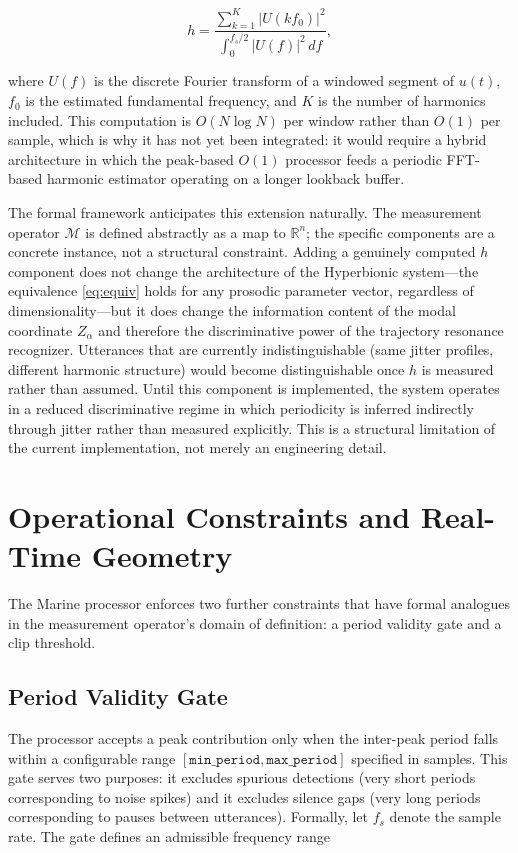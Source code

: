 \documentclass[12pt, a4paper]{article}
\begin{document}
\begin{equation}
h = \frac{\sum_{k=1}^{K} |U(k f_0)|^2}{\int_0^{f_s/2} |U(f)|^2\, df},
\label{eq:h}
\end{equation}

where $U(f)$ is the discrete Fourier transform of a windowed segment of $u(t)$, $f_0$ is the estimated fundamental frequency, and $K$ is the number of harmonics included. This computation is $O(N \log N)$ per window rather than $O(1)$ per sample, which is why it has not yet been integrated: it would require a hybrid architecture in which the peak-based $O(1)$ processor feeds a periodic FFT-based harmonic estimator operating on a longer lookback buffer.

The formal framework anticipates this extension naturally. The measurement operator $\mathcal{M}$ is defined abstractly as a map to $\mathbb{R}^n$; the specific components are a concrete instance, not a structural constraint. Adding a genuinely computed $h$ component does not change the architecture of the Hyperbionic system---the equivalence \eqref{eq:equiv} holds for any prosodic parameter vector, regardless of dimensionality---but it does change the information content of the modal coordinate $Z_\alpha$ and therefore the discriminative power of the trajectory resonance recognizer. Utterances that are currently indistinguishable (same jitter profiles, different harmonic structure) would become distinguishable once $h$ is measured rather than assumed. Until this component is implemented, the system operates in a reduced discriminative regime in which periodicity is inferred indirectly through jitter rather than measured explicitly. This is a structural limitation of the current implementation, not merely an engineering detail.

\section{Operational Constraints and Real-Time Geometry}

The Marine processor enforces two further constraints that have formal analogues in the measurement operator's domain of definition: a period validity gate and a clip threshold.

\subsection{Period Validity Gate}

The processor accepts a peak contribution only when the inter-peak period falls within a configurable range $[\texttt{min\_period}, \texttt{max\_period}]$ specified in samples. This gate serves two purposes: it excludes spurious detections (very short periods corresponding to noise spikes) and it excludes silence gaps (very long periods corresponding to pauses between utterances). Formally, let $f_s$ denote the sample rate. The gate defines an admissible frequency range
\end{document}
